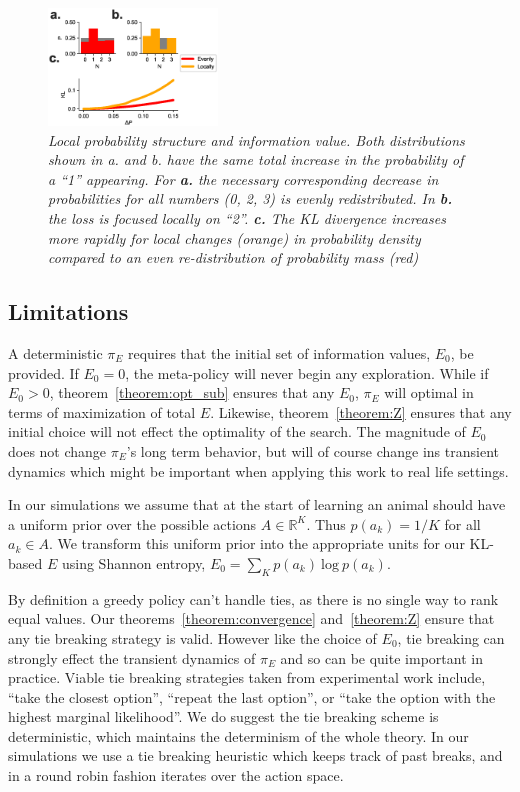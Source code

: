 \documentclass[9pt,twocolumn,twoside]{pnas-new}
\begin{document}
\begin{figure}
\includegraphics[width=0.4\textwidth]{figures/metrics_specifity.eps}
\caption{
\textit{Local probability structure and information value. Both distributions shown in a. and b. have the same total increase in the probability of a ``1'' appearing.
For \textbf{a.}  the necessary corresponding decrease in probabilities for all numbers (0, 2, 3) is evenly redistributed.
In \textbf{b.} the loss is focused locally on ``2''. 
\textbf{c.} The KL divergence increases more rapidly for local changes (orange) in probability density compared to an even re-distribution of probability mass (red)}}
\label{fig:metrics_specifity}
\end{figure}

\subsection*{Limitations}
A deterministic $\pi_E$ requires that the initial set of information values, $E_0$, be provided. If $E_0 = 0$, the meta-policy will never begin any exploration. While if $E_0 > 0$, theorem~\ref{theorem:opt_sub} ensures that any $E_0$, $\pi_E$ will optimal in terms of maximization of total $E$. Likewise, theorem~\ref{theorem:Z} ensures that any initial choice will not effect the optimality of the search. The magnitude of $E_0$ does not change $\pi_E$'s long term behavior, but will of course change ins transient dynamics which might be important when applying this work to real life settings. 

In our simulations we assume that at the start of learning an animal should have a uniform prior over the possible actions $A \in \mathbb{R}^K$. Thus $p(a_k) = 1/K$ for all $a_k \in A$. We transform this uniform prior into the appropriate units for our KL-based $E$ using Shannon entropy, $E_0 = \sum_K p(a_k)\ \text{log}\ p(a_k)$. 

By definition a greedy policy can't handle ties, as there is no single way to rank equal values. Our theorems~\ref{theorem:convergence} and~\ref{theorem:Z} ensure that any tie breaking strategy is valid. However like the choice of $E_0$, tie breaking can strongly effect the transient dynamics of $\pi_E$ and so can be quite important in practice. Viable tie breaking strategies taken from experimental work include, ``take the closest option'', ``repeat the last option'', or ``take the option with the highest marginal likelihood''. We do suggest the tie breaking scheme is deterministic, which maintains the determinism of the whole theory. In our simulations we use a tie breaking heuristic which keeps track of past breaks, and in a round robin fashion iterates over the action space.
\end{document}
